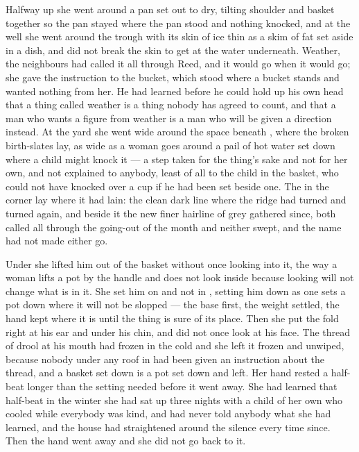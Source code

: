 Halfway up she went around a pan set out to dry, tilting shoulder and basket together so the pan stayed where the pan stood and nothing knocked, and at the well she went around the trough with its skin of ice thin as a skim of fat set aside in a dish, and did not break the skin to get at the water underneath. Weather, the neighbours had called it all through Reed, and it would go when it would go; she gave the instruction to the bucket, which stood where a bucket stands and wanted nothing from her. He had learned before he could hold up his own head that a thing called weather is a thing nobody has agreed to count, and that a man who wants a figure from weather is a man who will be given a direction instead. At the yard she went wide around the space beneath , where the broken birth-slates lay, as wide as a woman goes around a pail of hot water set down where a child might knock it --- a step taken for the thing's sake and not for her own, and not explained to anybody, least of all to the child in the basket, who could not have knocked over a cup if he had been set beside one. The  in the corner lay where it had lain: the clean dark line where the ridge had turned and turned again, and beside it the new finer hairline of grey gathered since, both called  all through the going-out of the month and neither swept, and the name had not made either go.

Under  she lifted him out of the basket without once looking into it, the way a woman lifts a pot by the handle and does not look inside because looking will not change what is in it. She set him on  and not in , setting him down as one sets a pot down where it will not be slopped --- the base first, the weight settled, the hand kept where it is until the thing is sure of its place. Then she put the fold right at his ear and under his chin, and did not once look at his face. The thread of drool at his mouth had frozen in the cold and she left it frozen and unwiped, because nobody under any roof in  had been given an instruction about the thread, and a basket set down is a pot set down and left. Her hand rested a half-beat longer than the setting needed before it went away. She had learned that half-beat in the winter she had sat up three nights with a child of her own who cooled while everybody was kind, and had never told anybody what she had learned, and the house had straightened around the silence every time since. Then the hand went away and she did not go back to it.

